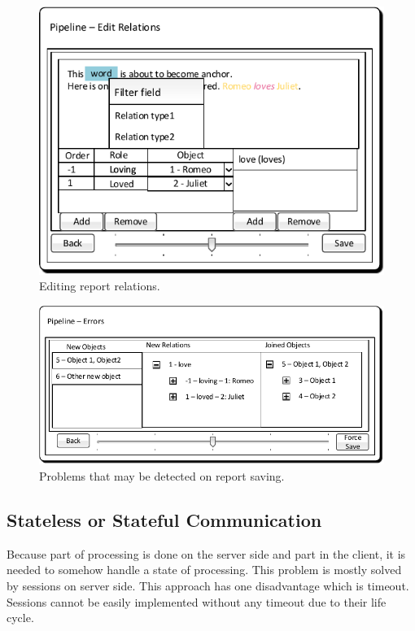 \begin{figure}[!htb]
        \centering
        \includegraphics{Images/MockupPipelineRelations}
        \caption{Editing report relations.}
        \label{fig:MockupPipelineRelations}
\end{figure}

\begin{figure}[!htb]
        \centering
        \includegraphics{Images/MockupPipelineErrors}
        \caption{Problems that may be detected on report saving.}
        \label{fig:MockupPipelineErrors}
\end{figure}

\subsection{Stateless or Stateful Communication}

Because part of processing is done on the server side and part in the client, it
is needed to somehow handle a state of processing. This problem is mostly solved
by sessions on server side. This approach has one disadvantage which is timeout.
Sessions cannot be easily implemented without any timeout due to their life cycle.

